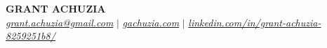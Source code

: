 \begin{center}
    \textbf{\Huge GRANT ACHUZIA} \\ \vspace{1pt}
    \href{mailto:grant.achuzia@gmail.com}{\emph{grant.achuzia@gmail.com}} \hspace{0.05em} $|$ \hspace{0.05em}
    \href{https://gachuzia.com/}{\emph{gachuzia.com}} \hspace{0.05em} $|$ \hspace{0.05em}
    \href{https://www.linkedin.com/in/grant-achuzia-8259251b8/}{\emph{linkedin.com/in/grant-achuzia-8259251b8/}}

\end{center}